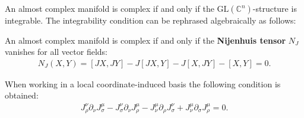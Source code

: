 
    \begin{property}
        An almost complex manifold is complex if and only if the $\text{GL}(\mathbb{C}^n)$-structure is integrable. The integrability condition can be rephrased algebraically as follows:
    \end{property}
    \begin{theorem}
        An almost complex manifold is complex if and only if the \textbf{Nijenhuis tensor} $N_J$ vanishes for all vector fields:
        \begin{gather}
            \label{complex:integrable_structure}
            N_J(X,Y) = [JX,JY] - J[JX,Y] - J[X,JY] - [X,Y] = 0.
        \end{gather}
    \end{theorem}
    When working in a local coordinate-induced basis the following condition is obtained:
    \begin{gather}
        J_\rho^\nu\partial_\nu J_\sigma^\mu - J_\sigma^\nu\partial_\nu J_\rho^\mu - J_\nu^\mu\partial_\rho J_\sigma^\nu + J_\nu^\mu\partial_\sigma J_\rho^\mu = 0.
    \end{gather}

